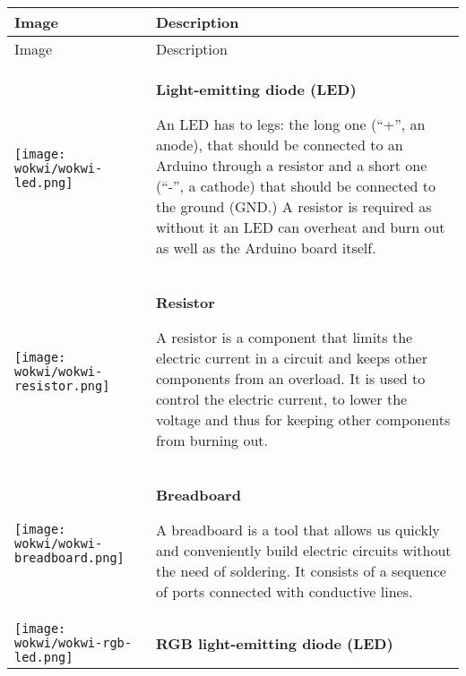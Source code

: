 \documentclass[../sparc.tex]{subfiles}
\begin{document}
\begin{longtable}{|>{
      \centering\arraybackslash
    }p{3cm}|>{
      \centering\arraybackslash}p{8cm}|
  }
  \hline
  Image & Description \\ \hline
  \endfirsthead

  \hline
  Image & Description \\ \hline
  \endhead

  \hline
  \parbox[t][1.4cm][c]{2cm}{\centering \vspace{1cm}
    \texttt{[image: wokwi/wokwi-led.png]}} &
  \parbox[t][3cm][t]{8cm}{
    \centering \textbf{Light-emitting diode (LED)}\\ \raggedright

    An LED has to legs: the long one (``+'', an anode), that should be connected
    to an Arduino through a resistor and a short one (``-'', a cathode) that
    should be connected to the ground (GND.)  A resistor is required as without
    it an LED can overheat and burn out as well as the Arduino board itself.

  } \\  \hline

  \parbox[t][0,5cm][c]{2cm}{\centering \vspace{1cm}
    \texttt{[image: wokwi/wokwi-resistor.png]}} &
  \parbox[t][2.6cm][t]{8cm}{
    \centering \textbf{Resistor}\\ \raggedright

    A resistor is a component that limits the electric current in a circuit and
    keeps other components from an overload.  It is used to control the electric
    current, to lower the voltage and thus for keeping other components from
    burning out.

  } \\  \hline

  \parbox[t][2,3cm][c]{2cm}{\centering \vspace{0.8cm}
    \texttt{[image: wokwi/wokwi-breadboard.png]}} &
  \parbox[t][3.9cm][t]{8cm}{
    \centering \textbf{Breadboard}\\ \raggedright

    A breadboard is a tool that allows us quickly and conveniently build
    electric circuits without the need of soldering.  It consists of a sequence
    of ports connected with conductive lines.

  } \\  \hline

  \parbox[t][3,6cm][c]{2cm}{\centering \vspace{1cm}
    \texttt{[image: wokwi/wokwi-rgb-led.png]}} &
  \parbox[t][5.1cm][t]{8cm}{
    \centering \textbf{RGB light-emitting diode (LED)}\\ \raggedright

}
\end{longtable}
\end{document}
